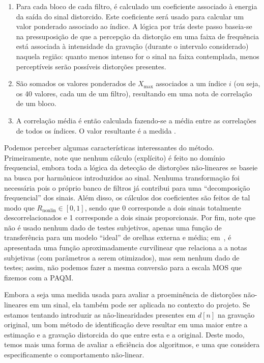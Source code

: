 \begin{enumerate}
	\item Para cada bloco de cada filtro, é calculado um coeficiente associado à energia da saída
	      do sinal distorcido. Este coeficiente será usado para calcular um valor ponderado
	      associado ao índice. A lógica por trás deste passo baseia-se na pressuposição de que a
	      percepção da distorção em uma faixa de frequência está associada à intensidade da
	      gravação (durante o intervalo considerado) naquela região: quanto menos intenso for o
	      sinal na faixa contemplada, menos perceptíveis serão possíveis distorções presentes.

	\item São somados os valores ponderados de $X_{\max}$ associados a um índice $i$ (ou seja, os
	      40 valores, cada um de um filtro), resultando em uma nota de correlação de um bloco.

	\item A correlação média é então calculada fazendo-se a média entre as correlações de todos
	      os índices. O valor resultante é a medida \rnonlin{}.
\end{enumerate}

Podemos perceber algumas características interessantes do método. Primeiramente, note
que nenhum cálculo (explícito) é feito no domínio frequencial, embora toda a lógica da
detecção de distorções não-lineares se baseie na busca por harmônicos introduzidos ao
sinal. Nenhuma transformação foi necessária pois o próprio banco de filtros já
contribui para uma ``decomposição frequencial'' dos sinais. Além disso, os cálculos dos
coeficientes são feitos de tal modo que $R_{\text{nonlin}} \in [0, 1]$, sendo que 0
corresponde a dois sinais totalmente descorrelacionados e 1 corresponde a dois sinais
proporcionais. Por fim, note que não é usado nenhum dado de testes subjetivos, apenas
uma função de transferência para um modelo ``ideal'' de orelhas externa e média;
em~\cite{tan-2004}, é apresentada uma função aproximadamente curvilinear que relaciona
a \rnonlin{} a notas subjetivas (com parâmetros a serem otimizados), mas sem nenhum
dado de testes; assim, não podemos fazer a mesma conversão para a escala MOS que
fizemos com a PAQM.

Embora a \rnonlin{} seja uma medida usada para avaliar a proeminência de distorções
não-lineares em um sinal, ela também pode ser aplicada no contexto do projeto. Se
estamos tentando introduzir as não-linearidades presentes em $d[n]$ na gravação
original, um bom método de identificação deve resultar em uma \rnonlin{} maior entre a
estimação e a gravação distorcida do que entre esta e a original. Deste modo, temos
mais uma forma de avaliar a eficiência dos algoritmos, e uma que considera
especificamente o comportamento não-linear.

